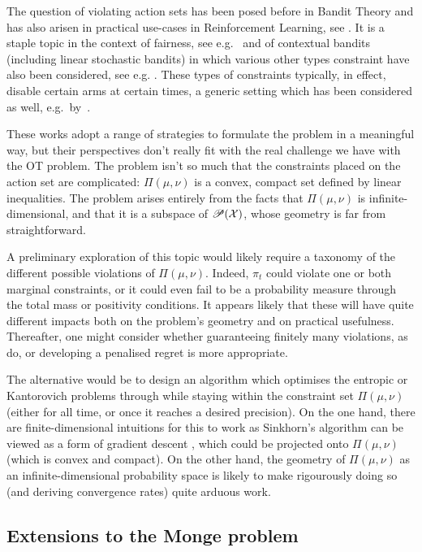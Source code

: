 The question of violating action sets has been posed before in Bandit Theory and has also arisen in practical use-cases in Reinforcement Learning, see \citep{seurin_im_2020}. It is a staple topic in the context of fairness, see e.g.\ \citep{joseph_fairness_2016} and of contextual bandits (including linear stochastic bandits) in which various other types constraint have also been considered, see e.g. \citep{liu_efficient_2024}. These types of constraints typically, in effect, disable certain arms at certain times, a generic setting which has been considered as well, e.g.\ by~\cite{kleinberg_regret_2010,abensur_productization_2019}. 

These works adopt a range of strategies to formulate the problem in a meaningful way, but their perspectives don't really fit with the real challenge we have with the OT problem. The problem isn't so much that the constraints placed on the action set are complicated: $\Pi(\mu,\nu)$ is a convex, compact set defined by linear inequalities. The problem arises entirely from the facts that $\Pi(\mu,\nu)$ is infinite-dimensional, and that it is a subspace of $\mathscr{P}(\mathcal{X})$, whose geometry is far from straightforward.

A preliminary exploration of this topic would likely require a taxonomy of the different possible violations of $\Pi(\mu,\nu)$. Indeed, $\pi_t$ could violate one or both marginal constraints, or it could even fail to be a probability measure through the total mass or positivity conditions. It appears likely that these will have quite different impacts both on the problem's geometry and on practical usefulness. Thereafter, one might consider whether guaranteeing finitely many violations, as~\cite{liu_efficient_2024} do, or developing a penalised regret is more appropriate.

The alternative would be to design an algorithm which optimises the entropic or Kantorovich problems through while staying within the constraint set $\Pi(\mu,\nu)$ (either for all time, or once it reaches a desired precision). On the one hand, there are finite-dimensional intuitions for this to work as Sinkhorn's algorithm can be viewed as a form of gradient descent \citep{leger_gradient_2021}, which could be projected onto $\Pi(\mu,\nu)$ (which is convex and compact). On the other hand, the geometry of $\Pi(\mu,\nu)$ as an infinite-dimensional probability space is likely to make rigourously doing so (and deriving convergence rates) quite arduous work. 


\subsection{Extensions to the Monge problem}\label{subsec: Monge pb}

